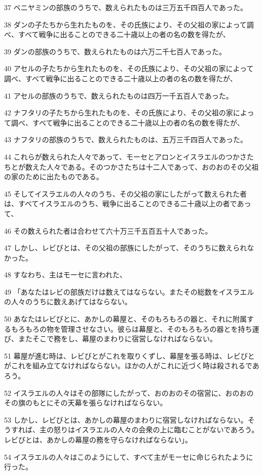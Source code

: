\par 37 ベニヤミンの部族のうちで、数えられたものは三万五千四百人であった。
\par 38 ダンの子たちから生れたものを、その氏族により、その父祖の家によって調べ、すべて戦争に出ることのできる二十歳以上の者の名の数を得たが、
\par 39 ダンの部族のうちで、数えられたものは六万二千七百人であった。
\par 40 アセルの子たちから生れたものを、その氏族により、その父祖の家によって調べ、すべて戦争に出ることのできる二十歳以上の者の名の数を得たが、
\par 41 アセルの部族のうちで、数えられたものは四万一千五百人であった。
\par 42 ナフタリの子たちから生れたものを、その氏族により、その父祖の家によって調べ、すべて戦争に出ることのできる二十歳以上の者の名の数を得たが、
\par 43 ナフタリの部族のうちで、数えられたものは、五万三千四百人であった。
\par 44 これらが数えられた人々であって、モーセとアロンとイスラエルのつかさたちとが数えた人々である。そのつかさたちは十二人であって、おのおのその父祖の家のために出たものである。
\par 45 そしてイスラエルの人々のうち、その父祖の家にしたがって数えられた者は、すべてイスラエルのうち、戦争に出ることのできる二十歳以上の者であって、
\par 46 その数えられた者は合わせて六十万三千五百五十人であった。
\par 47 しかし、レビびとは、その父祖の部族にしたがって、そのうちに数えられなかった。
\par 48 すなわち、主はモーセに言われた、
\par 49 「あなたはレビの部族だけは数えてはならない。またその総数をイスラエルの人々のうちに数えあげてはならない。
\par 50 あなたはレビびとに、あかしの幕屋と、そのもろもろの器と、それに附属するもろもろの物を管理させなさい。彼らは幕屋と、そのもろもろの器とを持ち運び、またそこで務をし、幕屋のまわりに宿営しなければならない。
\par 51 幕屋が進む時は、レビびとがこれを取りくずし、幕屋を張る時は、レビびとがこれを組み立てなければならない。ほかの人がこれに近づく時は殺されるであろう。
\par 52 イスラエルの人々はその部隊にしたがって、おのおのその宿営に、おのおのその旗のもとにその天幕を張らなければならない。
\par 53 しかし、レビびとは、あかしの幕屋のまわりに宿営しなければならない。そうすれば、主の怒りはイスラエルの人々の会衆の上に臨むことがないであろう。レビびとは、あかしの幕屋の務を守らなければならない」。
\par 54 イスラエルの人々はこのようにして、すべて主がモーセに命じられたように行った。


